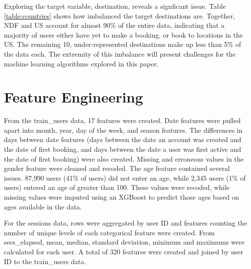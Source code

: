 \documentclass{article}
\begin{document}
Exploring the target variable, destination, reveals a signficant issue. Table \ref{table:countries} shows how imbalanced the target destinations are. Together, NDF and US account for almost 90\% of the entire data, indicating that a majority of users either have yet to make a booking, or book to locations in the US. The remaining 10, under-represented destinations make up less than 5\% of the data each. The extremity of this imbalance will present 
challenges for the machine learning algorithms explored in this paper.



\section{Feature Engineering}

From the train\_users data, 17 features were created. Date features were pulled apart into month, year, day of the week, and season features. The differences in days between date features (days between the date an account was created and the date of first booking, and days between the date a user was first active and the date of first booking) were also created. Missing and erroneous values in the gender feature were cleaned and recoded. The age feature contained several issues. 87,990 users (41\% of users) did not enter an age, while 2,345 users (1\% of users) entered an age of greater than 100. These values were recoded, while missing values were imputed using an XGBoost to predict those ages based on ages available in the data. 

For the sessions data, rows were aggregated by user ID and features counting the number of unique levels of each categorical feature were created. From secs\_elapsed, mean, median, standard deviation, minimum and maximums were calculated for each user. A total of 320 features were created and joined by user ID to the train\_users data. 
\end{document}
